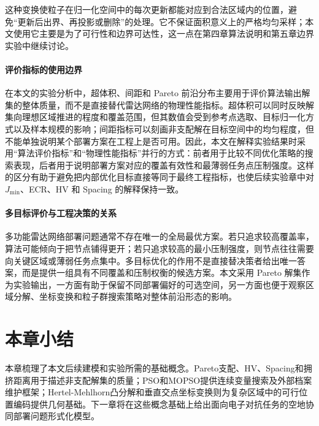 这种变换使粒子在归一化空间中的每次更新都能对应到合法区域内的位置，避免“更新后出界、再投影或删除”的处理。它不保证面积意义上的严格均匀采样；本文使用它主要是为了可行性和边界可达性，这一点在第四章算法说明和第五章边界实验中继续讨论。


\paragraph{评价指标的使用边界}
在本文的实验分析中，超体积、间距和 Pareto 前沿分布主要用于评价算法输出解集的整体质量，而不是直接替代雷达网络的物理性能指标。超体积可以同时反映解集向理想区域推进的程度和覆盖范围，但其数值会受到参考点选取、目标归一化方式以及样本规模的影响；间距指标可以刻画非支配解在目标空间中的均匀程度，但不能单独说明某个部署方案在工程上是否可用。因此，本文在解释实验结果时采用“算法评价指标”和“物理性能指标”并行的方式：前者用于比较不同优化策略的搜索表现，后者用于说明部署方案对应的覆盖有效性和最薄弱任务点压制强度。这样的区分有助于避免把内部优化目标直接等同于最终工程指标，也使后续实验章中对 $J_{\min}$、ECR、HV 和 Spacing 的解释保持一致。

\paragraph{多目标评价与工程决策的关系}
多功能雷达网络部署问题通常不存在唯一的全局最优方案。若只追求较高覆盖率，算法可能倾向于把节点铺得更开；若只追求较高的最小压制强度，则节点往往需要向关键区域或薄弱任务点集中。多目标优化的作用不是直接替决策者给出唯一答案，而是提供一组具有不同覆盖和压制权衡的候选方案。本文采用 Pareto 解集作为实验输出，一方面有助于保留不同部署偏好的可选空间，另一方面也便于观察区域分解、坐标变换和粒子群搜索策略对整体前沿形态的影响。


\section{本章小结}

本章梳理了本文后续建模和实验所需的基础概念。Pareto支配、HV、Spacing和拥挤距离用于描述非支配解集的质量；PSO和MOPSO提供连续变量搜索及外部档案维护框架；Hertel-Mehlhorn凸分解和垂直交点坐标变换则为复杂区域中的可行位置编码提供几何基础。下一章将在这些概念基础上给出面向电子对抗任务的空地协同部署问题形式化模型。

